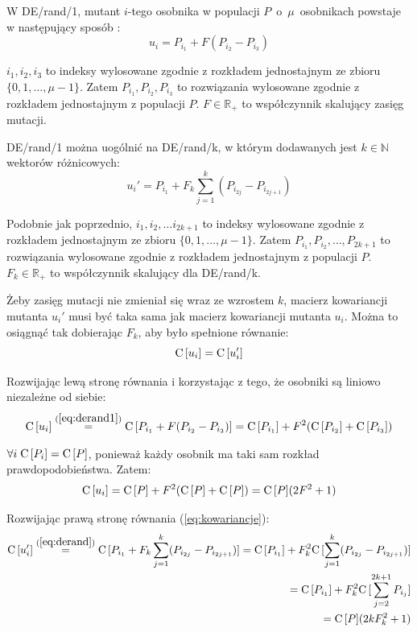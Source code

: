 \documentclass[a4paper,onecolumn,oneside,12pt,wide,floatssmall]{mwrep}
\def\C{{\rm C}\,}
\theoremstyle{definition}
\theoremstyle{plain}%
\theoremstyle{remark}
\begin{document}
W DE/rand/1, mutant $i$-tego osobnika w populacji $P$~o~$\mu$~osobnikach powstaje w następujący sposób 
\cite{decomposition}:
\begin{equation} \label{eq:derand1}
u_i = P_{i_1} + F(P_{i_2} - P_{i_3})
\end{equation}

$i_1, i_2, i_3$ to indeksy wylosowane zgodnie z rozkładem jednostajnym ze zbioru \\ 
$\{0, 1, \dots, \mu-1\}$. Zatem $P_{i_1}, P_{i_2}, P_{i_3}$ to rozwiązania wylosowane zgodnie z 
rozkładem jednostajnym z populacji $P$.
$F\in\mathbb{R_+}$ to współczynnik skalujący zasięg mutacji. 

DE/rand/1 można uogólnić na DE/rand/k, w którym dodawanych jest
$k \in \mathbb{N}$ wektorów różnicowych:
\begin{equation} \label{eq:derand}
u_i' = P_{i_1} + F_k\sum\limits_{j=1}^k (P_{i_{2j}} - P_{i_{2j+1}})
\end{equation}

Podobnie jak poprzednio, $i_1, i_2, \dots i_{2k+1}$ to indeksy wylosowane zgodnie z rozkładem jednostajnym ze zbioru 
$\{0, 1, \dots, \mu-1\}$. Zatem $P_{i_1}, P_{i_2}, \dots, P_{2k+1}$ to rozwiązania wylosowane zgodnie z rozkładem 
jednostajnym z populacji $P$. $F_k\in\mathbb{R_+}$ to współczynnik skalujący dla DE/rand/k. 

Żeby zasięg mutacji nie zmieniał się wraz ze wzrostem $k$, 
macierz kowariancji mutanta $u_i'$ musi być taka sama jak macierz kowariancji mutanta $u_i$.
Można to osiągnąć tak dobierając $F_k$, aby było spełnione równanie:
\begin{equation} \label{eq:kowariancje}
\C[u_i] = \C[u_i']
\end{equation}

Rozwijając lewą stronę równania i korzystając z tego, że osobniki są liniowo niezależne od siebie:
\begin{align*}
\C[u_i] \overset{(\ref{eq:derand1})}{=} \C[P_{i_1} + F(P_{i_2} - P_{i_3})] = \C[P_{i_1}] + F^2(\C[P_{i_2}] + \C[P_{i_3}])
\end{align*}

$\forall{i}\hspace{1mm}\C[P_i] = \C[P]$, ponieważ każdy osobnik ma taki sam rozkład prawdopodobieństwa. Zatem:
\begin{equation} \label{eq:macierz_kow_mutanta}
\C[u_i] = \C[P] + F^2(\C[P] + \C[P]) = \C[P](2F^2 + 1)
\end{equation}

Rozwijając prawą stronę równania (\ref{eq:kowariancje}):
\begin{align*}
\C[u_i'] \overset{(\ref{eq:derand})}{=} \C[P_{i_1} + F_k\sum\limits_{j=1}^k (P_{i_{2j}} - P_{i_{2j+1}})] 
= \C[P_{i_1}] + F_k^2\C[\sum\limits_{j=1}^k (P_{i_{2j}} - P_{i_{2j+1}})] \\
= \C[P_{i_1}] + F_k^2\C[\sum\limits_{j=2}^{2k+1} P_{i_{j}}] \\
= \C[P](2kF_k^2 + 1)
\end{align*}
\end{document}
